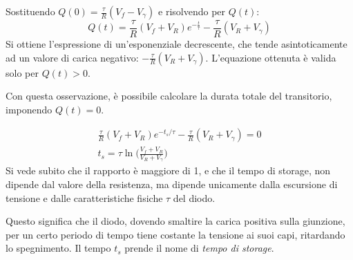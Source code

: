 \documentclass[../elettronica]{subfiles}
\begin{document}
Sostituendo $Q(0) = \frac{\tau}{R}(V_f - V_\gamma)$ e risolvendo per $Q(t)$:
$$
    Q(t) = \frac{\tau}{R}(V_f + V_R) e^{-\frac{t}{\tau}} - \frac{\tau}{R}(V_R + V_\gamma)
$$
Si ottiene l'espressione di un'esponenziale decrescente, che tende asintoticamente ad un valore di carica negativo: $-\frac{\tau}{R}(V_R + V_\gamma)$.
L'equazione ottenuta è valida solo per $Q(t) > 0$.

Con questa osservazione, è possibile calcolare la durata totale del transitorio, imponendo $Q(t) = 0$.

\begin{align*}
    \frac{\tau}{R}(V_f + V_R) e ^ {-t_s/\tau} - \frac{\tau}{R}(V_R + V_\gamma) = 0
    \\
    t_s = \tau \ln\Big(\frac{V_f + V_R}{V_R + V_\gamma}\Big)
\end{align*}
Si vede subito che il rapporto è maggiore di 1, e che il tempo di storage, non dipende dal valore della resistenza,
ma dipende unicamente dalla escursione di tensione e dalle caratteristiche fisiche $\tau$ del diodo.

Questo significa che il diodo, dovendo smaltire la carica positiva sulla giunzione, per un certo periodo di tempo tiene costante
la tensione ai suoi capi, ritardando lo spegnimento.
Il tempo $t_s$ prende il nome di \textit{tempo di storage}.
\end{document}
